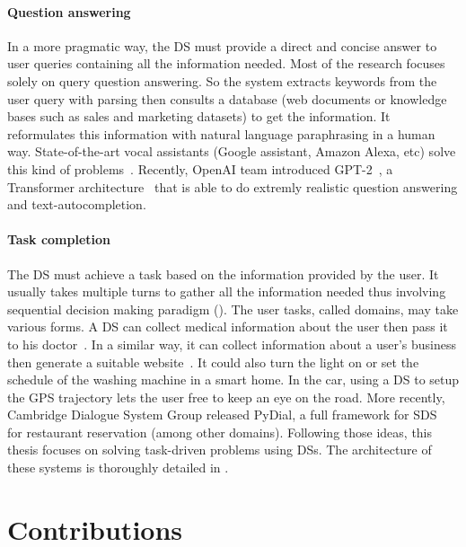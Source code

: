 \paragraph{Question answering} In a more pragmatic way, the \gls{DS} must provide a direct and concise answer to user queries containing all the information needed. Most of the research focuses solely on query question answering. So the system extracts keywords from the user query with  parsing then consults a database (web documents or knowledge bases such as sales and marketing datasets) to get the information.
It reformulates this information with natural language paraphrasing in a human way. State-of-the-art vocal assistants (Google assistant, Amazon Alexa, etc) solve this kind of problems~\parencite{mobile-speech-solution}. Recently, OpenAI team introduced GPT-2~\parencite{radford2019language}, a Transformer architecture~\parencite{vaswani2017attention} that is able to do extremly realistic question answering and text-autocompletion.


\paragraph{Task completion} The \gls{DS} must achieve a task based on the information provided by the user. It usually takes multiple  turns to gather all the information needed thus involving sequential decision making paradigm (). The user tasks, called domains, may take various forms. A \gls{DS} can collect medical information about the user then pass it to his doctor~\parencite{melody-baidu}. In a similar way, it can collect information about a user's business then generate a suitable website~\parencite{right-click}. It could also turn the light on or set the schedule of the washing machine in a smart home. In the car, using a \gls{DS} to setup the GPS trajectory lets the user free to keep an eye on the road. More recently, Cambridge Dialogue System Group released PyDial, a full framework for \gls{SDS}~\parencite{pydial} for restaurant reservation (among other domains). Following those ideas, this thesis focuses on solving task-driven problems using  \glspl{DS}. The architecture of these systems is thoroughly detailed in .

\section{Contributions}
\label{paragraph:contributions}


